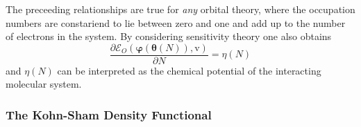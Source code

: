 \documentclass[aps,preprint]{revtex4}%
\begin{document}
The preceeding relationships are true for \emph{any} orbital theory, where the
occupation numbers are constariend to lie between zero and one and add up to
the number of electrons in the system. By considering sensitivity theory one
also obtains
\begin{equation}
\frac{\partial\mathcal{E}_{O}\left(  \boldsymbol{\varphi}\left(
\boldsymbol{\theta}\left(  N\right)  \right)  \boldsymbol{,}\mathrm{v}\right)
}{\partial N}=\eta\left(  N\right)
\end{equation}
and $\eta\left(  N\right)  $ can be interpreted as the chemical potential of
the interacting molecular system.

\subsubsection{The Kohn-Sham Density Functional}
\end{document}
